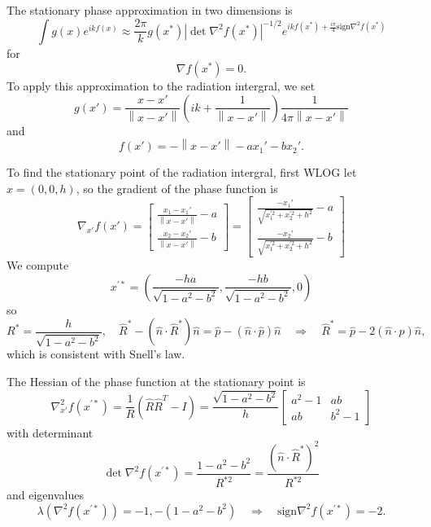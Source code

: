 \documentclass{article}
\newcommand{\norm}[1]{\left\lVert #1 \right\rVert}
\newcommand{\abs}[1]{\left\lvert #1 \right\rvert}
\theoremstyle{plain}
\begin{document}
The stationary phase approximation in two dimensions is
\begin{equation}
	\int g(x) e^{ikf(x)}
	\approx \frac{2\pi}{k} g(x^*)
	\abs{\det \nabla^2 f(x^*)}^{-1/2}
	e^{ikf(x^*) + \frac{i\pi}{4}\text{sign}\nabla^2 f(x^*)}
\end{equation}
for
\begin{equation}
	\nabla f(x^*) = 0.
\end{equation}
To apply this approximation to the radiation intergral,
we set
\begin{equation}
	g(x') = 
	\frac{x-x'}{\norm{x-x'}}
	\left( ik + \frac{1}{\norm{x-x'}} \right)
	\frac{1}{4\pi\norm{x-x'}}
\end{equation}
and
\begin{equation}
	f(x') = -\norm{x-x'} - ax_1' - bx_2'.
\end{equation}

To find the stationary point of the radiation intergral, first WLOG let $x=(0,0,h)$,
so the gradient of the phase function is
\begin{equation}
	\nabla_{x'} f(x') = 
	\begin{bmatrix}
		\frac{x_1 - x_1'}{\norm{x-x'}} - a \\
		\frac{x_2 - x_2'}{\norm{x-x'}} - b
	\end{bmatrix}
	=
	\begin{bmatrix}
		\frac{-x_1'}{\sqrt{x_1^{'2} + x_2^{'2} + h^2}} - a \\
		\frac{-x_2'}{\sqrt{x_1^{'2} + x_2^{'2} + h^2}} - b
	\end{bmatrix}
\end{equation} %
We compute
\begin{equation}
	x^{'*} = \left( \frac{-ha}{\sqrt{ 1 - a^2 - b^2 }}, \frac{-hb}{\sqrt{ 1 - a^2 - b^2 }}, 0 \right)
\end{equation}
so
\begin{equation}
	R^* = \frac{h}{\sqrt{1-a^2-b^2}},
	\quad \hat{R}^* - \left( \hat{n}\cdot\hat{R}^* \right)\hat{n} = \hat{p} - \left( \hat{n}\cdot\hat{p} \right)\hat{n}
	\quad\Rightarrow\quad \hat{R}^* = \hat{p} - 2\left( \hat{n}\cdot\hat{p} \right)\hat{n},
\end{equation}
which is consistent with Snell's law.


The Hessian of the phase function at the stationary point is
\begin{equation}
	\nabla^2_{x'} f(x^{'*}) =
	\frac{1}{R}\left( \hat{R}\hat{R}^T - I \right) =
	\frac{\sqrt{1-a^2-b^2}}{h}
	\begin{bmatrix}
		a^2-1 & ab \\
		ab & b^2-1
	\end{bmatrix}
\end{equation}
with determinant
\begin{equation}
	\det \nabla^2 f(x^{'*})
	= \frac{1-a^2-b^2}{R^{*2}}
	= \frac{\left(\hat{n}\cdot\hat{R}^*\right)^2}{R^{*2}}
\end{equation}
and eigenvalues
\begin{equation}
	\lambda\left( \nabla^2 f(x^{'*}) \right) = 
	-1, -\left( 1-a^2-b^2 \right)
	\quad\Rightarrow\quad \text{sign}\nabla^2 f(x^{'*}) = -2.
\end{equation}
\end{document}
